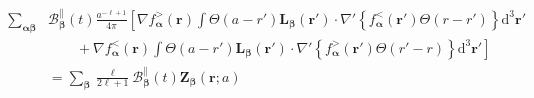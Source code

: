 \documentclass{article}
\begin{document}
\begin{equation}
\begin{split}
\sum_{\bm{\alpha}\bm{\beta}}& \mathcal{B}_{\bm{\beta}}^\parallel(t)\frac{a^{-\ell + 1}}{4\pi}\left[\nabla f_{\bm{\alpha}}^>(\mathbf{r})\int\Theta(a - r')\mathbf{L}_{\bm{\beta}}(\mathbf{r}')\cdot\nabla'\left\{f_{\bm{\alpha}}^<(\mathbf{r}')\Theta(r - r')\right\}\mathrm{d}^3\mathbf{r}'\right.\\
&\left.\qquad+ \nabla f_{\bm{\alpha}}^<(\mathbf{r})\int\Theta(a - r')\mathbf{L}_{\bm{\beta}}(\mathbf{r}')\cdot\nabla'\left\{f_{\bm{\alpha}}^>(\mathbf{r}')\Theta(r' - r)\right\}\mathrm{d}^3\mathbf{r}'\right]\\
&= \sum_{\bm{\beta}}\frac{\ell}{2\ell + 1}\mathcal{B}_{\bm{\beta}}^\parallel(t)\mathbf{Z}_{\bm{\beta}}(\mathbf{r};a)
\end{split}
\end{equation}
\end{document}
